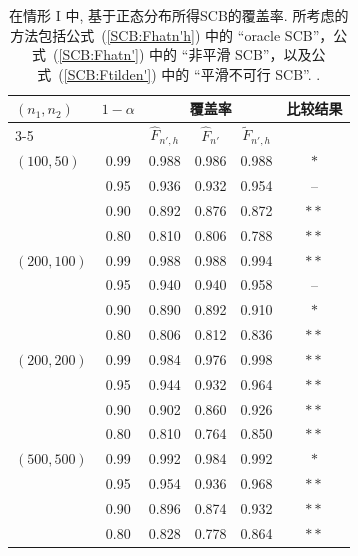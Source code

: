 \documentclass[a4paper,openay,14pt]{ctexbook}
\numberwithin{equation}{section}
\numberwithin{lem}{section}
\begin{document}
\begin{table}[tph]
\caption{在情形 I 中, 基于正态分布所得SCB的覆盖率. 所考虑的方法包括公式~(\ref{SCB:Fhatn'h}) 中的 ``oracle SCB''，公式~(\ref{SCB:Fhatn'}) 中的 ``非平滑 SCB''，以及公式~(\ref{SCB:Ftilden'}) 中的 ``平滑不可行 SCB''.
.}
\label{TAB:coveragerate-N(0,1)}
\centering
\begin{tabular}{lccccc}
\toprule
\multirow{2}{*}{$(n_1,n_2)$} & \multirow{2}{*}{$1-\alpha$} & \multicolumn{3}{c}{覆盖率} & \multirow{2}{*}{比较结果} \\ 
\cmidrule{3-5}
& & $\hat{F}_{n', h}$ & $\hat{F}_{n'}$ & $\tilde{F}_{n', h}$ & \\ 
\midrule
$(100,50)$  & 0.99 & 0.988 & 0.986 & 0.988 & $\ast$ \\
            & 0.95 & 0.936 & 0.932 & 0.954 & -- \\
            & 0.90 & 0.892 & 0.876 & 0.872 & $\ast\ast$ \\
            & 0.80 & 0.810 & 0.806 & 0.788 & $\ast\ast$ \\ \addlinespace
$(200,100)$ & 0.99 & 0.988 & 0.988 & 0.994 & $\ast\ast$ \\
            & 0.95 & 0.940 & 0.940 & 0.958 & -- \\
            & 0.90 & 0.890 & 0.892 & 0.910 & $\ast$ \\
            & 0.80 & 0.806 & 0.812 & 0.836 & $\ast\ast$ \\ \addlinespace
$(200,200)$ & 0.99 & 0.984 & 0.976 & 0.998 & $\ast\ast$ \\
            & 0.95 & 0.944 & 0.932 & 0.964 & $\ast\ast$ \\
            & 0.90 & 0.902 & 0.860 & 0.926 & $\ast\ast$ \\
            & 0.80 & 0.810 & 0.764 & 0.850 & $\ast\ast$ \\ \addlinespace
$(500,500)$ & 0.99 & 0.992 & 0.984 & 0.992 & $\ast$ \\
            & 0.95 & 0.954 & 0.936 & 0.968 & $\ast\ast$\\
            & 0.90 & 0.896 & 0.874 & 0.932 & $\ast\ast$ \\
            & 0.80 & 0.828 & 0.778 & 0.864 & $\ast\ast$\\ 
\bottomrule
\end{tabular}
\end{table}
\end{document}
